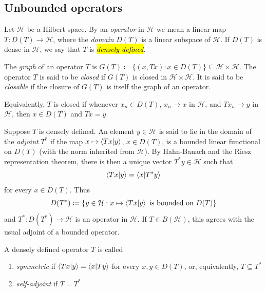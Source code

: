 \subsection{Unbounded operators}

Let $\mathcal H$ be a Hilbert space.
By an \emph{operator} in $\mathcal H$ we mean a linear map
\(
T \colon D(T) \to \mathcal H
\),
where the \emph{domain} $D(T)$ is a linear subspace of $\mathcal H$.
If $D(T)$ is dense in $\mathcal H$, we say that $T$ is \hl{\emph{densely defined}}.

The \emph{graph} of an operator $T$ is
\(
G(T) \coloneq \{(x,Tx) : x \in D(T)\} \subseteq \mathcal H \times \mathcal H
\).
The operator $T$ is said to be \emph{closed} if $G(T)$ is closed in $\mathcal H \times \mathcal H$.
It is said to be \emph{closable} if the closure of $G(T)$ is itself the graph of an operator.

Equivalently, $T$ is closed if whenever $x_n \in D(T)$, $x_n \to x$ in $\mathcal H$, and $Tx_n \to y$ in $\mathcal H$, then $x \in D(T)$ and $Tx = y$.

Suppose $T$ is densely defined.
An element $y \in \mathcal H$ is said to lie in the domain of the \emph{adjoint} $T^*$ if the map
\(
x \mapsto \braket{Tx | y}
\),
\(
x \in D(T)
\),
is a bounded linear functional on $D(T)$ (with the norm inherited from $\mathcal H$).
By Hahn-Banach and the Riesz representation theorem, there is then a unique vector $T^*y \in \mathcal H$ such that
\[
\braket{Tx | y} = \braket{x | T^*y}
\]
for every $x \in D(T)$.
Thus
\[
D(T^*) \coloneq \left\{y \in \mathcal H : x \mapsto \braket{Tx | y}
\text{ is bounded on } D(T)\right\}
\]
and $T^* \colon D(T^*) \to \mathcal H$ is an operator in $\mathcal H$.
If $T \in B(\mathcal H)$, this agrees with the usual adjoint of a bounded operator.

\begin{definition}\label{def:symmetric-self-adjoint-unbounded}
A densely defined operator $T$ is called
\begin{enumerate}[label=(\alph*)]
\item 
\emph{symmetric} if
\(
\braket{Tx | y} = \braket{x | Ty}
\)
for every $x,y \in D(T)$, or,
equivalently,
\(
T \subseteq T^*
\)
\item \label{item:densely-defined-self-adjoint}
\emph{self-adjoint} if
\(
T = T^*
\)
\qedhere
\end{enumerate}
\end{definition}


